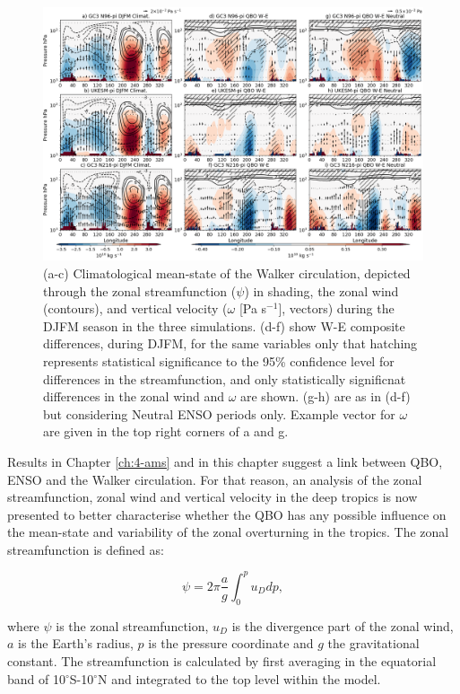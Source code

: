 \begin{figure}[b!]
\centering
 \noindent
 \includegraphics[width=\linewidth]{figures/cmip_streamdjfm.png}
\caption[Walker circulation anomalies in DJFM]{(a-c) Climatological mean-state of the Walker circulation, depicted through the zonal streamfunction ($\psi$) in shading, the zonal wind (contours), and vertical velocity ($\omega$ [Pa s$^{-1}$], vectors) during the DJFM season in the three simulations. (d-f) show W-E composite differences, during DJFM, for the same variables only that hatching represents statistical significance to the 95\% confidence level for differences in the streamfunction, and only statistically significnat differences in the zonal wind and $\omega$ are shown. (g-h) are as in (d-f) but considering Neutral ENSO periods only. Example vector for $\omega$ are given in the top right corners of a and g.  }
\label{fig:walker_djfm}
\end{figure}

Results in Chapter \ref{ch:4-ams} and in this chapter suggest a link between QBO, ENSO and the Walker circulation. For that reason, an analysis of the zonal streamfunction, zonal wind and vertical velocity in the deep tropics is now presented to better characterise whether the QBO has any possible influence on the mean-state and variability of the zonal overturning in the tropics. 
The zonal streamfunction \citep{yu2010,bayr2014} is defined as:

\begin{equation}
\psi=2\pi \frac{a}{g} \int_0^p u_D dp,
\end{equation}

\noindent where $\psi$ is the zonal streamfunction, $u_D$ is the divergence part of the zonal wind, $a$ is the Earth's radius, $p$ is the pressure coordinate and $g$ the gravitational constant.
The streamfunction is calculated by first averaging in the equatorial band of 10$^\circ$S-10$^\circ$N and integrated to the top level within the model. 



